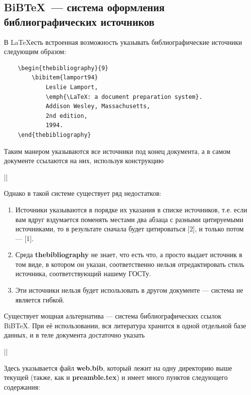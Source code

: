 \subsection{BiB\TeX~--- система оформления библиографических источников}

В \LaTeX есть встроенная возможность указывать библиографические источники следующим образом:

\begin{verbatim}
    \begin{thebibliography}{9}
        \bibitem{lamport94}
            Leslie Lamport,
            \emph{\LaTeX: a document preparation system}.
            Addison Wesley, Massachusetts,
            2nd edition,
            1994.
    \end{thebibliography}
\end{verbatim}

Таким манером указываются все источники под конец документа, а в самом документе ссылаются на них, используя конструкцию

|\cite{lamport94}|

Однако в такой системе существует ряд недостатков:

\begin{enumerate}
    \item Источники указываются в порядке их указания в списке источников, т.е. если вам вдруг вздумается поменять местами два абзаца с разными цитируемыми источниками, то в результате сначала будет цитироваться [2], и только потом --- [1].
    \item Среда \textbf{thebibliography} не знает, что есть что, а просто выдает источник в том виде, в котором он указан, соответственно нельзя отредактировать стиль источника, соответствующий нашему ГОСТу.
    \item Эти источники нельзя будет использовать в другом документе --- система не является гибкой.
\end{enumerate}

Существует мощная альтернатива --- система библиографических ссылок BiB\TeX. При её использовании, вся литература хранится в одной отдельной базе данных, и в теле документа достаточно указать

||

Здесь указывается файл \textbf{web.bib}, который лежит на одну директорию выше текущей (также, как и \textbf{preamble.tex}) и имеет много пунктов следующего содержания:

